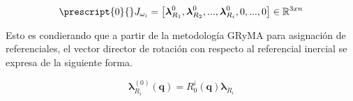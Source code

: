         \begin{equation}
            \prescript{0}{}J_{\omega_i} =
            \left[\boldsymbol{\lambda}^{0}_{R_1}, \boldsymbol{\lambda}^{0}_{R_2}, ..., \boldsymbol{\lambda}^{0}_{R_i}, 0, ..., 0\right]
            \in \mathbb{R}^{3xn}
            \label{eq:Jw}
        \end{equation}

        Esto es condierando que a partir de la metodología GRyMA para asignación de referenciales, 
        el vector director de rotación con respecto al referencial inercial se expresa de la siguiente 
        forma.

        \begin{equation*}
            \boldsymbol{\lambda}^{(0)}_{R_i}(\boldsymbol{q}) = R^i_0(\boldsymbol{q})\boldsymbol{\lambda}_{R_i}
        \end{equation*}